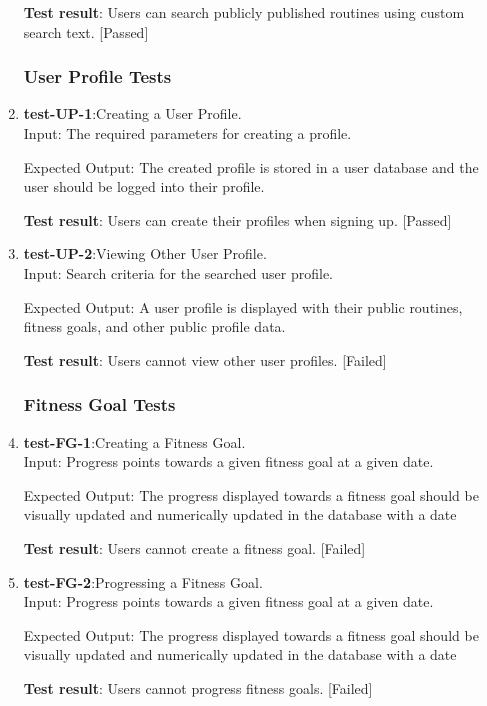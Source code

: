 \documentclass[12pt, titlepage]{article}
\begin{document}
\begin{enumerate}
    \textbf{Test result}: Users can search publicly published routines using custom search text. [Passed]
   
\subsubsection{User Profile Tests}
    \item{\textbf{test-UP-1}}:Creating a User Profile.\\
    Input: The required parameters for creating a profile.
	
    Expected Output: The created profile is stored in a user database and the user should be logged into their profile.
    
    \textbf{Test result}: Users can create their profiles when signing up. [Passed]
   
    \item{\textbf{test-UP-2}}:Viewing Other User Profile.\\
    Input: Search criteria for the searched user profile.
	
    Expected Output: A user profile is displayed with their public routines, fitness goals, and other public profile data.
    
    \textbf{Test result}: Users cannot view other user profiles. [Failed]
   
\subsubsection{Fitness Goal Tests}
    \item{\textbf{test-FG-1}}:Creating a Fitness Goal.\\
    Input: Progress points towards a given fitness goal at a given date.
	
    Expected Output: The progress displayed towards a fitness goal should be visually updated and numerically updated in the database with a date
    
    \textbf{Test result}: Users cannot create a fitness goal. [Failed]
   
    \item{\textbf{test-FG-2}}:Progressing a Fitness Goal.\\
    Input: Progress points towards a given fitness goal at a given date.
	
    Expected Output: The progress displayed towards a fitness goal should be visually updated and numerically updated in the database with a date
    
    \textbf{Test result}: Users cannot progress fitness goals. [Failed]
 
\end{enumerate}
\end{document}
